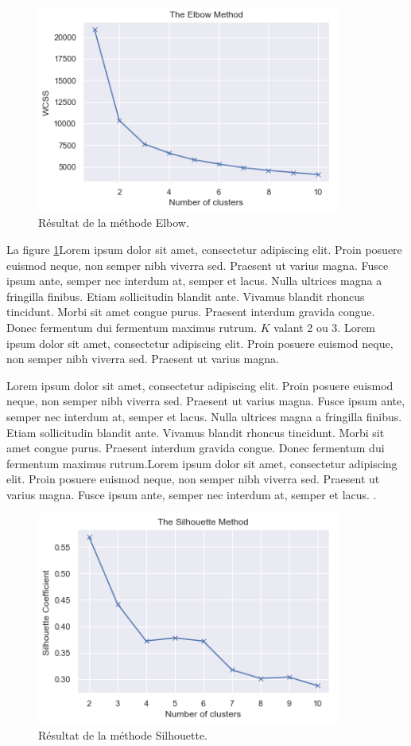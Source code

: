 \begin{figure}[hbt!]
  \centering
  \includegraphics[width=10cm]{images_pfe/elbow_method.png}
  \caption{Résultat de la méthode Elbow.}
  \label{fig:elbow-method}
\end{figure}
\FloatBarrier

La figure \ref{fig:elbow-method}Lorem ipsum dolor sit amet, consectetur adipiscing elit. Proin posuere euismod neque, non semper nibh viverra sed. Praesent ut varius magna. Fusce ipsum ante, semper nec interdum at, semper et lacus. Nulla ultrices magna a fringilla finibus. Etiam sollicitudin blandit ante. Vivamus blandit rhoncus tincidunt. Morbi sit amet congue purus. Praesent interdum gravida congue. Donec fermentum dui fermentum maximus rutrum. $K$ valant 2 ou 3. Lorem ipsum dolor sit amet, consectetur adipiscing elit. Proin posuere euismod neque, non semper nibh viverra sed. Praesent ut varius magna. 

\medskip

Lorem ipsum dolor sit amet, consectetur adipiscing elit. Proin posuere euismod neque, non semper nibh viverra sed. Praesent ut varius magna. Fusce ipsum ante, semper nec interdum at, semper et lacus. Nulla ultrices magna a fringilla finibus. Etiam sollicitudin blandit ante. Vivamus blandit rhoncus tincidunt. Morbi sit amet congue purus. Praesent interdum gravida congue. Donec fermentum dui fermentum maximus rutrum.Lorem ipsum dolor sit amet, consectetur adipiscing elit. Proin posuere euismod neque, non semper nibh viverra sed. Praesent ut varius magna. Fusce ipsum ante, semper nec interdum at, semper et lacus. \parencite{kassambara_determining_nodate}.

\begin{figure}[hbt!]
  \centering
  \includegraphics[width=10cm]{images_pfe/silhouette.png}
  \caption{Résultat de la méthode Silhouette.}
  \label{fig:silhouette-method}
\end{figure}
\FloatBarrier

